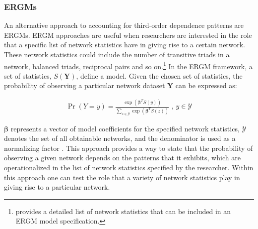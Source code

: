 \documentclass[12pt,pdflatex]{elsarticle}
\begin{document}
\subsubsection{\textbf{ERGMs}}

An alternative approach to accounting for third-order dependence patterns are ERGMs. %
ERGM approaches are useful when researchers are interested in the role that a specific list of network statistics have in giving rise to a certain network. These network statistics could include the number of transitive triads in a network, balanced triads, reciprocal pairs and so on.\footnote{\citet{snijders:etal:2006} provides a detailed list of network statistics that can be included in an ERGM model specification.} In the ERGM framework, a set of statistics, $S(\mathbf{Y})$, define a model. Given the chosen set of statistics, the probability of observing a particular network dataset $\mathbf{Y}$ can be expressed as:

\begin{align}
\Pr(Y = y) = \frac{ \exp( \bm\beta^{T} S(y)  )  }{ \sum_{z \in \mathcal{Y}} \exp( \bm\beta^{T} S(z)  )  } \text{ ,  } y \in \mathcal{Y}
\label{eqn:ergm}
\end{align}

$\bm\beta$ represents a vector of model coefficients for the specified network statistics, $\mathcal{Y}$ denotes the set of all obtainable networks, and the denominator is used as a normalizing factor \citep{hunter:etal:2008}. This approach provides a way to state that the probability of observing a given network depends on the patterns that it exhibits, which are operationalized in the list of network statistics specified by the researcher. Within this approach one can test the role that a variety of network statistics play in giving rise to a particular network. %
\end{document}
